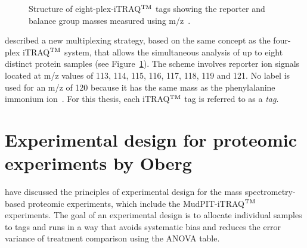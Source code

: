 \documentclass[11pt,a4paper]{article}
\begin{document}
\begin{figure}[htb]
\caption{Structure of eight-plex-iTRAQ$^{\rm TM}$ tags showing the reporter and balance group masses measured using m/z~\citep{Choe2007}.}
\label{fig:eight-plex}
\end{figure}

\cite{Choe2007} described a new multiplexing strategy, based on the same concept as the four-plex iTRAQ$^{\rm TM}$ system, that allows the simultaneous analysis of up to eight distinct protein samples (see Figure~\ref{fig:eight-plex}). The scheme involves reporter ion signals located at m/z values of 113, 114, 115, 116, 117, 118, 119 and 121. No label is used for an m/z of 120 because it has the same mass as the phenylalanine immonium ion~\citep{Pierce2008}.  For this thesis, each iTRAQ$^{\rm TM}$ tag is referred to as a \emph{tag}. 

\section{Experimental design for proteomic experiments by Oberg}
\label{sec:oberg}
\cite{Oberg2009} have discussed the principles of experimental design for the mass spectrometry-based proteomic experiments, which include the MudPIT-iTRAQ$^{\rm TM}$ experiments. The goal of an experimental design is to allocate individual samples to tags and runs in a way that avoids systematic bias and reduces the error variance of treatment comparison using the ANOVA table. 
\end{document}
